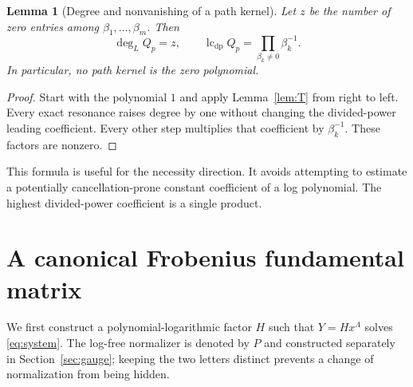 \documentclass[11pt,a4paper]{article}
\numberwithin{equation}{section}
\newtheorem{lemma}[theorem]{Lemma}
\theoremstyle{definition}
\theoremstyle{remark}
\newcommand{\lc}{\operatorname{lc}_{\mathrm{dp}}}
\begin{document}
\begin{lemma}[Degree and nonvanishing of a path kernel]\label{lem:leading}
Let $z$ be the number of zero entries among $\beta_1,\ldots,\beta_m$.
Then
\begin{equation}\label{eq:leading}
 \deg_L Q_p=z,\qquad
 \lc Q_p=\prod_{\beta_k\ne0}\beta_k^{-1}.
\end{equation}
In particular, no path kernel is the zero polynomial.
\end{lemma}
\begin{proof}
Start with the polynomial $1$ and apply Lemma~\ref{lem:T} from right to
left. Every exact resonance raises degree by one without changing the
divided-power leading coefficient. Every other step multiplies that
coefficient by $\beta_k^{-1}$. These factors are nonzero.
\end{proof}

This formula is useful for the necessity direction. It avoids attempting
to estimate a potentially cancellation-prone constant coefficient of a
log polynomial. The highest divided-power coefficient is a single product.

\section{A canonical Frobenius fundamental matrix}
\label{sec:formal}

We first construct a polynomial-logarithmic factor $H$ such that
$Y=Hx^\Lambda$ solves \eqref{eq:system}. The log-free normalizer is denoted
by $P$ and constructed separately in Section~\ref{sec:gauge}; keeping the
two letters distinct prevents a change of normalization from being hidden.
\end{document}
